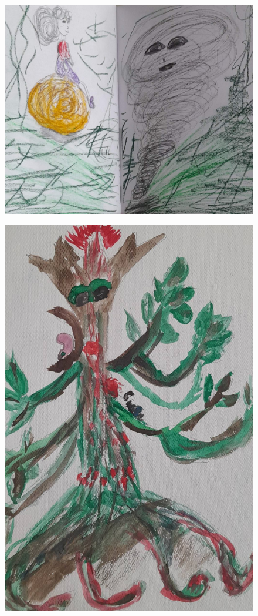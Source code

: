 \documentclass[12pt, a4paper, twoside]{book} %
\begin{document}
\begin{figure}[H]
	\centering
	\includegraphics[width=\textwidth]{./images/1f81324df3ed55.jpg}
\end{figure}

\begin{figure}[H]
	\centering
	\includegraphics[width=\textwidth]{./images/1f81324df17c98.jpg}
\end{figure}
\end{document}
